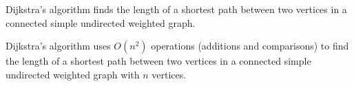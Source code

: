 \documentclass[12pt]{article}
\begin{document}
\begin{theorem} Dijkstra's algorithm finds the length of a shortest path between two vertices in a connected simple undirected weighted graph. \end{theorem} 

\begin{theorem} Dijkstra's algorithm uses $O(n^2)$ operations (additions and comparisons) to find the length of a shortest path between two vertices in a connected simple undirected weighted graph with $n$ vertices. \end{theorem} 
\end{document}
